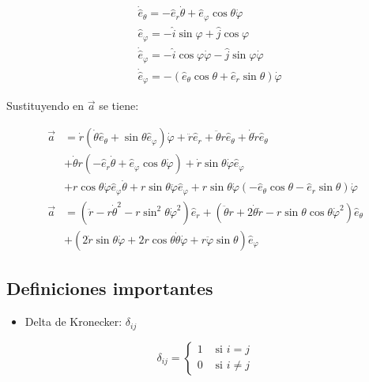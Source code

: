 $$
\begin{aligned}
& \dot{\hat{e}}_{\theta}=-\widehat{e}_{r} \dot{\theta}+\hat{e}_{\varphi} \cos \theta \dot{\varphi} \\
& \widehat{e}_{\varphi}=-\hat{i} \sin \varphi+\hat{j} \cos \varphi \\
& \dot{\hat{e}}_{\varphi}=-\hat{i} \cos \varphi \dot{\varphi}-\hat{j} \sin \varphi \dot{\varphi} \\
& \dot{\hat{e}}_{\varphi}=-\left(\hat{e}_{\theta} \cos \theta+\hat{e}_{r} \sin \theta\right) \dot{\varphi}
\end{aligned}
$$

Sustituyendo en $\vec{a}$ se tiene:

$$
\begin{aligned}
\vec{a} & =\dot{r}\left(\dot{\theta} \widehat{e}_{\theta}+\sin \theta \widehat{e}_{\varphi}\right) \dot{\varphi}+\ddot{r} \hat{e}_{r}+\ddot{\theta} r \widehat{e}_{\theta}+\dot{\theta} \dot{r} \widehat{e}_{\theta} \\
& +\dot{\theta} r\left(-\hat{e}_{r} \dot{\theta}+\widehat{e}_{\varphi} \cos \theta \dot{\varphi}\right)+\dot{r} \sin \theta \dot{\varphi} \widehat{e}_{\varphi} \\
& +r \cos \theta \dot{\varphi} \widehat{e}_{\varphi} \dot{\theta}+r \sin \theta \ddot{\varphi} \widehat{e}_{\varphi}+r \sin \theta \dot{\varphi}\left(-\widehat{e}_{\theta} \cos \theta-\widehat{e}_{r} \sin \theta\right) \dot{\varphi} \\
\vec{a} & =\left(\ddot{r}-r \dot{\theta}^{2}-r \sin ^{2} \theta \dot{\varphi}^{2}\right) \widehat{e}_{r}+\left(\ddot{\theta} r+2 \dot{\theta} \dot{r}-r \sin \theta \cos \theta \dot{\varphi}^{2}\right) \widehat{e}_{\theta} \\
& +(2 \dot{r} \sin \theta \dot{\varphi}+2 r \cos \theta \dot{\theta} \dot{\varphi}+r \ddot{\varphi} \sin \theta) \widehat{e}_{\varphi}
\end{aligned}
$$

\subsection{Definiciones importantes}
\begin{itemize}
  \item Delta de Kronecker: $\delta_{i j}$
\end{itemize}

$$
\delta_{i j}= \begin{cases}1 & \text { si } i=j \\ 0 & \text { si } i \neq j\end{cases}
$$

